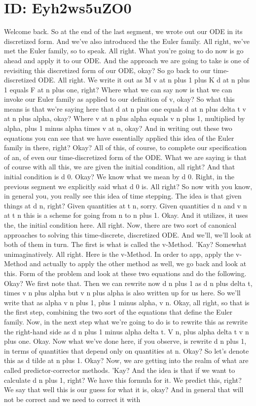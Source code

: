 \documentclass[10pt]{article}
\begin{document}
\section*{ID: Eyh2ws5uZO0}
Welcome back. So at the end of the last segment, we wrote out our ODE in its discretized form. And we've also introduced the the Euler family. All right, we've met the Euler family, so to speak. All right. What you're going to do now is go ahead and apply it to our ODE. And the approach we are going to take is one of revisiting this discretized form of our ODE, okay? So go back to our time-discretized ODE. All right. We write it out as M v at n plus 1 plus K d at n plus 1 equals F at n plus one, right? Where what we can say now is that we can invoke our Euler family as applied to our definition of v, okay? So what this means is that we're saying here that d at n plus one equals d at n plus delta t v at n plus alpha, okay? Where v at n plus alpha equals v n plus 1, multiplied by alpha, plus 1 minus alpha times v at n, okay? And in writing out these two equations you can see that we have essentially applied this idea of the Euler family in there, right? Okay? All of this, of course, to complete our specification of an, of even our time-discretized form of the ODE. What we are saying is that of course with all this, we are given the initial condition, all right? And that initial condition is d 0. Okay? We know what we mean by d 0. Right, in the previous segment we explicitly said what d 0 is. All right? So now with you know, in general you, you really see this idea of time stepping. The idea is that given things at d n, right? Given quantities at t n, sorry. Given quantities d n and v n at t n this is a scheme for going from n to n plus 1. Okay. And it utilizes, it uses the, the initial condition here. All right. Now, there are two sort of canonical approaches to solving this time-discrete, discretized ODE. And we'll, we'll look at both of them in turn. The first is what is called the v-Method. 'Kay? Somewhat unimaginatively. All right. Here is the v-Method. In order to app, apply the v-Method and actually to apply the other method as well, we go back and look at this. Form of the problem and look at these two equations and do the following. Okay? We first note that. Then we can rewrite now d n plus 1 as d n plus delta t, times v n plus alpha but v n plus alpha is also written up for us here. So we'll write that as alpha v n plus 1, plus 1 minus alpha, v n. Okay, all right, so that is the first step, combining the two sort of the equations that define the Euler family. Now, in the next step what we're going to do is to rewrite this as rewrite the right-hand side as d n plus 1 minus alpha delta t. V n, plus alpha delta t v n plus one. Okay. Now what we've done here, if you observe, is rewrite d n plus 1, in terms of quantities that depend only on quantities at n. Okay? So let's denote this as d tilde at n plus 1. Okay? Now, we are getting into the realm of what are called predictor-corrector methods. 'Kay? And the idea is that if we want to calculate d n plus 1, right? We have this formula for it. We predict this, right? We say that well this is our guess for what it is, okay? And in general that will not be correct and we need to correct it with 
\end{document}
